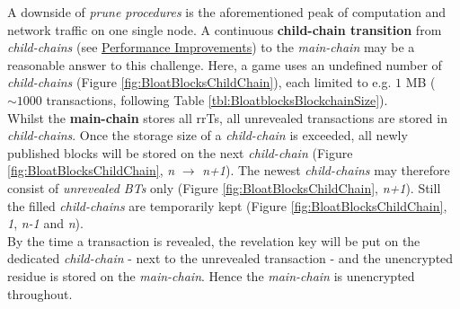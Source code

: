 \noindent A downside of \textit{prune procedures} is the aforementioned peak of computation and network traffic on one single node.
A continuous \textbf{child-chain transition} from \textit{child-chains}
(see \hyperref[sec:PerformanceImprovements]{Performance Improvements})
to the \textit{main-chain} may be a reasonable answer to this challenge.
Here, a game uses an undefined number of \textit{child-chains} (Figure \ref{fig:BloatBlocksChildChain}),
each limited to e.g. $1$ MB ($\sim 1000$ transactions, following Table \ref{tbl:BloatblocksBlockchainSize}). \\
Whilst the \textbf{main-chain} stores all \gls{rrTs}, all unrevealed transactions are stored in \textit{child-chains}.
Once the storage size of a \textit{child-chain} is exceeded, all newly published blocks will be stored
on the next \textit{child-chain} (Figure \ref{fig:BloatBlocksChildChain}, \textit{n} $\to$ \textit{n+1}).
The newest \textit{child-chains} may therefore consist of \textit{unrevealed \gls{BT}s} only (Figure \ref{fig:BloatBlocksChildChain}, \textit{n+1}).
Still the filled \textit{child-chains} are temporarily kept (Figure \ref{fig:BloatBlocksChildChain}, \textit{1}, \textit{n-1} and \textit{n}). \\
By the time a transaction is revealed, the revelation key will be put on the dedicated \textit{child-chain}
- next to the unrevealed transaction - and the unencrypted residue is stored on the \textit{main-chain}.
Hence the \textit{main-chain} is unencrypted throughout.
\begin{figure}
\end{figure}

